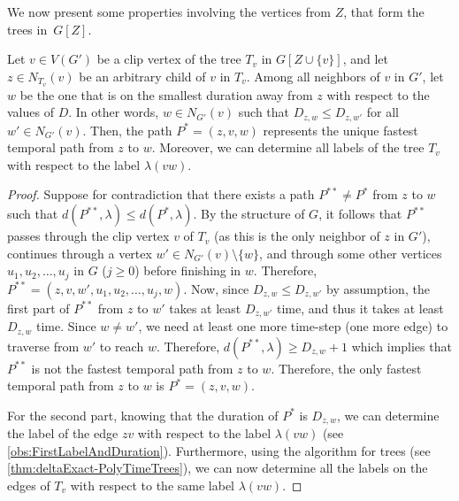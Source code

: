\documentclass[a4paper,UKenglish,cleveref, autoref, thm-restate]{lipics-v2021}
\begin{document}
We now present some properties involving the vertices from $Z$, that form the trees in~$G[Z]$.
\begin{lemma}\label{lemma:ftp-tree-neighbor}
Let $v \in V(G')$ be a clip vertex of the tree $T_v$ in $G[Z \cup \{v\}]$, and let $z \in N_{T_v}(v)$ be an arbitrary child of $v$ in $T_v$. 
Among all neighbors of $v$ in $G'$, let $w$ be the one that is on the smallest duration away from $z$ with respect to the values of $D$. 
In other words, $w \in N_{G'}(v)$ such that $D_{z,w} \leq D_{z,w'}$ for all $w' \in N_{G'}(v)$.
Then, the path $P^*=(z,v,w)$ represents the unique fastest temporal path from $z$ to $w$.
%
Moreover, we can determine all labels of the tree $T_v$ with respect to the label $\lambda(vw)$.
\end{lemma}
\begin{proof}
Suppose for contradiction that there exists a path $P^{**} \neq P^*$ from $z$ to $w$ such that $d(P^{**},\lambda) \leq d(P^*,\lambda)$. 
By the structure of $G$, it follows that $P^{**}$ passes through the clip vertex $v$ of $T_v$ (as this is the only neighbor of $z$ in $G'$), continues through a vertex $w' \in N_{G'}(v) \setminus \{w \}$, 
and through some other vertices $u_1, u_2, \dots, u_j$ in $G$ ($j \geq 0$) before finishing in $w$.
Therefore, $P^{**}= (z,v,w',u_1,u_2,\dots,u_j,w)$.
Now, since $D_{z,w} \leq D_{z,w'}$ by assumption, the first part of $P^{**}$ from $z$ to $w'$ takes at least $D_{z,w'}$ time, and thus it takes at least $D_{z,w}$ time.
Since $w \neq w'$, we need at least one more time-step (one more edge) to traverse from $w'$ to reach $w$. 
Therefore, $d(P^{**}, \lambda) \geq D_{z,w} + 1$ 
which implies that $P^{**}$ is not the fastest temporal path from $z$ to $w$. Therefore, the only fastest temporal path from $z$ to $w$ is $P^*=(z,v,w)$.

For the second part, knowing that the duration of $P^*$ is $D_{z,w}$, we can determine the label of the edge $z v$ with respect to the label $\lambda(vw)$ (see \cref{obs:FirstLabelAndDuration}).
Furthermore, using the algorithm for trees (see \cref{thm:deltaExact-PolyTimeTrees}), we can now determine all the labels on the edges of $T_v$ with respect to the same label $\lambda(v w)$.
\end{proof}
\end{document}

